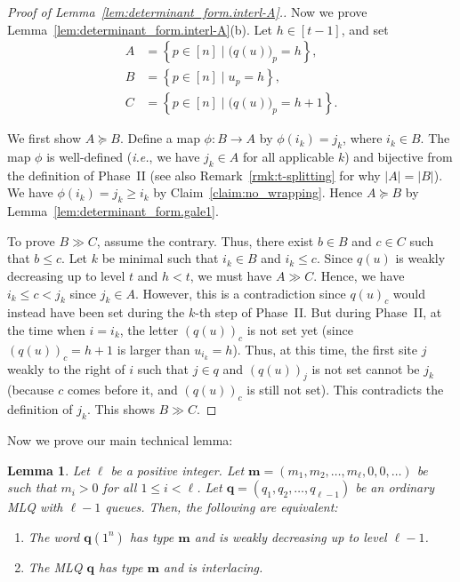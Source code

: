 \documentclass[reqno]{amsart}
\newcommand{\0}{\phantom{c}}
\newcommand{\mm}{\mathbf{m}}
\newcommand{\qq}{\mathbf{q}}
\newenvironment{verlong}{}{}
\newenvironment{vershort}{}{}
\newcommand{\set}[1]{\left\{ #1 \right\}}
\newcommand{\abs}[1]{\left| #1 \right|}
\newcommand{\tup}[1]{\left( #1 \right)}
\newcommand{\ive}[1]{\left[ #1 \right]}
\theoremstyle{plain}
\newtheorem{lemma}[thm]{Lemma}
\theoremstyle{definition}
\numberwithin{equation}{section}
\begin{document}
\begin{proof}[Proof of Lemma~\ref{lem:determinant_form.interl-A}.]
Now we prove Lemma~\ref{lem:determinant_form.interl-A}(b).
Let $h \in \ive{t-1}$, and set
\begin{align*}
A & = \set{ p \in \ive{n} \mid \bigl( q(u) \bigr)_p = h },
\\
B & = \set{ p \in \ive{n} \mid u_p = h },
\\
C & = \set{ p \in \ive{n} \mid \bigl( q(u) \bigr)_p = h+1 }.
\end{align*}

We first show $A \succeq B$.
Define a map $\phi \colon B \to A$ by $\phi(i_k) = j_k$, where $i_k \in B$.
The map $\phi$ is well-defined (\textit{i.e.}, we have $j_k \in A$ for all applicable $k$) and bijective from the definition of Phase~II (see also Remark~\ref{rmk:t-splitting} for why $\abs{A} = \abs{B}$).
We have $\phi(i_k) = j_k \geq i_k$ by Claim~\ref{claim:no_wrapping}.
Hence $A \succeq B$ by Lemma~\ref{lem:determinant_form.gale1}.

To prove $B \gg C$, assume the contrary.
Thus, there exist $b \in B$ and $c \in C$ such that $b \leq c$.
Let $k$ be minimal such that $i_k \in B$ and $i_k \leq c$.
Since $q(u)$ is weakly decreasing up to level $t$ and $h < t$, we must have $A \gg C$.
Hence, we have $i_k \leq c < j_k$ since $j_k \in A$.
\begin{vershort}
However, this is a contradiction since $q(u)_c$ would instead have been set during the $k$-th step of Phase~II.
\end{vershort}
\begin{verlong}
But during Phase~II, at the time when $i = i_k$,
the letter $(q(u))_c$ is not set yet (since $(q(u))_c = h+1$ is
larger than $u_{i_k} = h$).
Thus, at this time, the first site $j$ weakly to the right of $i$ such that $j \in q$ and $(q(u))_j$ is not set cannot be $j_k$ (because $c$ comes before it, and $(q(u))_c$ is still not set).
This contradicts the definition of $j_k$.
\end{verlong}
This shows $B \gg C$.
\end{proof}

Now we prove our main technical lemma:

\begin{lemma}
\label{lem:determinant_form.interl-act}
Let $\ell$ be a positive integer.
Let $\mm = \tup{m_1, m_2, \dotsc, m_{\ell}, 0, 0, \ldots}$ be such that $m_i > 0$ for all $1 \leq i < \ell$.
Let $\qq = \tup{q_1, q_2, \dotsc, q_{\ell-1}}$ be an ordinary MLQ with $\ell-1$ queues.
Then, the following are equivalent:
\begin{enumerate}
\item[($\alpha$)] The word $\qq(1^n)$ has type $\mm$ and is weakly decreasing up to level $\ell-1$.
\item[($\beta$)] The MLQ $\qq$ has type $\mm$ and is interlacing.
\end{enumerate}
\end{lemma}
\end{document}
